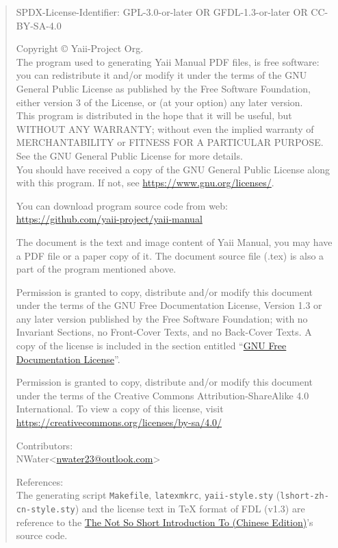 \newpage\thispagestyle{empty}
\begin{quote}\footnotesize
SPDX-License-Identifier: GPL-3.0-or-later OR GFDL-1.3-or-later OR CC-BY-SA-4.0

Copyright \copyright{} {\the\year} Yaii-Project Org. \\
The program used to generating Yaii Manual PDF files, is free software: you can redistribute it and/or modify it under the terms of the GNU General Public License as published by the Free Software Foundation, either version 3 of the License, or (at your option) any later version. \\
This program is distributed in the hope that it will be useful, but WITHOUT ANY WARRANTY; without even the implied warranty of MERCHANTABILITY or FITNESS FOR A PARTICULAR PURPOSE. See the GNU General Public License for more details. \\
You should have received a copy of the GNU General Public License along with this program. If not, see \url{https://www.gnu.org/licenses/}.

You can download program source code from web: \url{https://github.com/yaii-project/yaii-manual}

The document is the text and image content of Yaii Manual, you may have a PDF file or a paper copy of it. The document source file (.tex) is also a part of the program mentioned above.

Permission is granted to copy, distribute and/or modify this document
under the terms of the GNU Free Documentation License, Version 1.3
or any later version published by the Free Software Foundation;
with no Invariant Sections, no Front-Cover Texts, and no Back-Cover Texts.
A copy of the license is included in the section entitled ``\hyperref[label_fdl]{GNU
Free Documentation License}''.

Permission is granted to copy, distribute and/or modify this document
under the terms of the Creative Commons Attribution-ShareAlike 4.0 International. To view a copy of this license, visit \url{https://creativecommons.org/licenses/by-sa/4.0/}

Contributors: \\
NWater<\href{mailto:nwater23@outlook.com}{nwater23@outlook.com}>

References: \\
The generating script \verb|Makefile|, \verb|latexmkrc|, \verb|yaii-style.sty| (\verb|lshort-zh-cn-style.sty|) and the license text in \TeX{} format of FDL (v1.3) are reference to the \href{https://ctan.org/pkg/lshort-zh-cn}{The Not So Short Introduction To \LaTeXe (Chinese Edition)}'s source code.

\end{quote}
\endinput

